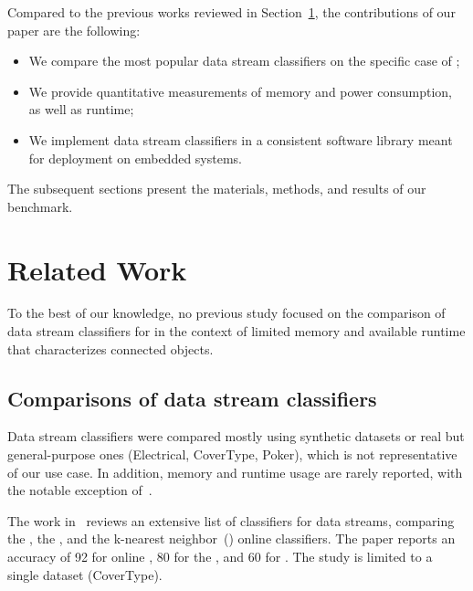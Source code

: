 Compared to the previous works reviewed in Section~\ref{sec:related-work}, the contributions of our paper are the following:
\begin{itemize}
    \item We compare the most popular data stream classifiers on the specific case of \har;
    \item We provide quantitative measurements of memory and power consumption, as well as runtime;
    \item We implement data stream classifiers in a consistent software library meant for deployment on embedded systems.
\end{itemize} 
The subsequent sections present the materials, methods, and results of our benchmark.


\section{Related Work}

\label{sec:related-work}

To the best of our knowledge, no previous study focused on the comparison
of data stream classifiers for \har in the context of limited memory and
available runtime that characterizes connected objects.

\subsection{Comparisons of data stream classifiers}

Data stream classifiers were compared mostly using synthetic datasets or real
but general-purpose ones (Electrical, CoverType, Poker), which is not
representative of our use case. 
In addition, memory and runtime usage are rarely
reported, with the notable exception of~\cite{StreamDM-CPP}.

The work in~\cite{prasad2016stream} reviews an extensive list of classifiers for
data streams, comparing the \hoeffdingtree, the \naivebayes, and the k-nearest
neighbor~(\knn) online classifiers. The paper reports an accuracy of 92 for
online \knn, 80 for the \hoeffdingtree, and 60 for \naivebayes. The study is
limited to a single dataset (CoverType). 

